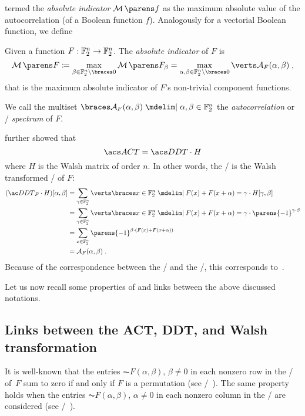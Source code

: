 \textcite{JUCS:ZhaZhe96} termed the \emph{absolute indicator} $\absoluteindicator{f}$ as the maximum absolute value of the autocorrelation (of a Boolean function $f$).
Analogously for a vectorial Boolean function, we define
\begin{definition}
    Given a function $F : \mathbb{F}_2^n \to \mathbb{F}_2^n$.
    The \emph{absolute indicator} of $F$ is
    \begin{equation*}
        \absoluteindicator{F} \coloneqq \max_{\beta \in \F_2^n \setminus \set{0}} \absoluteindicator{F_\beta} = \max_{\alpha, \beta \in \F_2^n \setminus \set{0}} \abs{\AC{F}(\alpha, \beta)}\;,
    \end{equation*}
    that is the maximum absolute indicator of $F$'s non-trivial component functions.
\end{definition}

We call the multiset $\set{\AC{F}(\alpha, \beta) \given \alpha, \beta \in \F_2^n}$ the \emph{autocorrelation} or \ACT/ \emph{spectrum} of $F$.

\textcite[Section~3]{DCC:ZhaZheIma00} further showed that
\begin{equation*}
    \ACTs/ = \DDTs/ \cdot H
\end{equation*}
where $H$ is the Walsh matrix of order $n$.
In other words, the \ACT/ is the Walsh transformed \DDT/ of $F$:
\begin{align*}
    (\DDT/_F \cdot H)[\alpha, \beta]
    &= \sum_{\gamma \in \F_2^n} \abs{\set{x \in \F_2^n \given F(x) + F(x+\alpha) = \gamma}} \cdot H[\gamma, \beta] \\
    &= \sum_{\gamma \in \F_2^n} \abs{\set{x \in \F_2^n \given F(x) + F(x+\alpha) = \gamma}} \cdot \parens{-1}^{\iprod{\gamma}{\beta}} \\
    &= \sum_{x \in \F_2^n} \parens{-1}^{\iprod{\beta}{(F(x) + F(x+\alpha))}} \\
    &= \AC{F}(\alpha, \beta)\;.
\end{align*}
Because of the correspondence between the \ACT/ and the \DLCT/, this corresponds to~\cite[Proposition~1]{EC:BDKW19}.

Let us now recall some properties of and links between the above discussed notations.

\subsection{Links between the ACT, DDT, and Walsh transformation}

It is well-known that the entries $\AC{F}(\alpha,\beta)$, $\beta \neq 0$ in each nonzero row in the \ACT/ of~$F$ sum to zero if and only if $F$ is a permutation (see \eg/~\cite[Proposition~2]{TIT:BCCL06}).
The same property holds when the entries $\AC{F}(\alpha,\beta)$, $\alpha \neq 0$ in each nonzero column in the \ACT/ are considered (see \eg/~\cite[Eq.~(9)]{TIT:BCCL06}).

